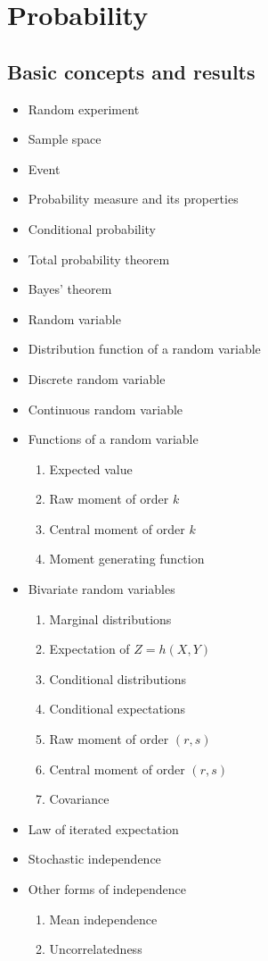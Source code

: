 \chapter{Probability}

\section{Basic concepts and results}

\begin{itemize}
    \item Random experiment
    \item Sample space
    \item Event
    \item Probability measure and its properties
    \item Conditional probability
    \item Total probability theorem
    \item Bayes' theorem
    \item Random variable
    \item Distribution function of a random variable
    \item Discrete random variable
    \item Continuous random variable
    \item Functions of a random variable
        \begin{enumerate}
            \item Expected value
            \item Raw moment of order $k$
            \item Central moment of order $k$
            \item Moment generating function
        \end{enumerate}
    \item Bivariate random variables
        \begin{enumerate}
            \item Marginal distributions
            \item Expectation of $Z = h(X,Y)$
            \item Conditional distributions
            \item Conditional expectations
            \item Raw moment of order $(r,s)$
            \item Central moment of order $(r,s)$
            \item Covariance
        \end{enumerate}
    \item Law of iterated expectation
    \item Stochastic independence
    \item Other forms of independence
        \begin{enumerate}
            \item Mean independence
            \item Uncorrelatedness
        \end{enumerate}
\end{itemize}

